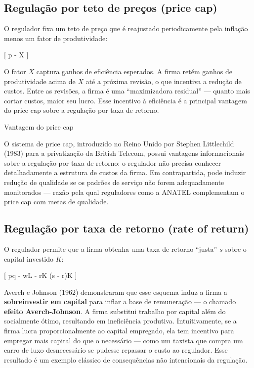 \documentclass[11pt,twoside,openright]{book}
\begin{document}
\subsection{Regulação por teto de preços (price
cap)}\label{regulauxe7uxe3o-por-teto-de-preuxe7os-price-cap}

O regulador fixa um teto de preço que é reajustado periodicamente pela
inflação menos um fator de produtividade:

{[} \Delta p \leq {} - X {]}

O fator \(X\) captura ganhos de eficiência esperados. A firma retém
ganhos de produtividade acima de \(X\) até a próxima revisão, o que
incentiva a redução de custos. Entre as revisões, a firma é uma
``maximizadora residual'' --- quanto mais cortar custos, maior seu
lucro. Esse incentivo à eficiência é a principal vantagem do price cap
sobre a regulação por taxa de retorno.

\begin{notebox}{Vantagem do price cap}

O sistema de price cap, introduzido no Reino Unido por Stephen
Littlechild (1983) para a privatização da British Telecom, possui
vantagens informacionais sobre a regulação por taxa de retorno: o
regulador não precisa conhecer detalhadamente a estrutura de custos da
firma. Em contrapartida, pode induzir redução de qualidade se os padrões
de serviço não forem adequadamente monitorados --- razão pela qual
reguladores como a ANATEL complementam o price cap com metas de
qualidade.

\end{notebox}

\subsection{Regulação por taxa de retorno (rate of
return)}\label{regulauxe7uxe3o-por-taxa-de-retorno-rate-of-return}

O regulador permite que a firma obtenha uma taxa de retorno ``justa''
\(s\) sobre o capital investido \(K\):

{[} pq - wL - rK \leq (s - r)K \label{eq:15.14}  {]}

Averch e Johnson (1962) demonstraram que esse esquema induz a firma a
\textbf{sobreinvestir em capital} para inflar a base de remuneração ---
o chamado \textbf{efeito Averch-Johnson}. A firma substitui trabalho por
capital além do socialmente ótimo, resultando em ineficiência produtiva.
Intuitivamente, se a firma lucra proporcionalmente ao capital empregado,
ela tem incentivo para empregar mais capital do que o necessário ---
como um taxista que compra um carro de luxo desnecessário se pudesse
repassar o custo ao regulador. Esse resultado é um exemplo clássico de
consequências não intencionais da regulação.
\end{document}
